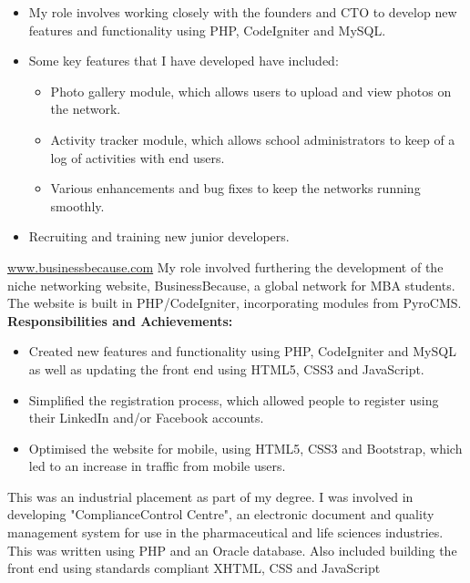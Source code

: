 \documentclass[11pt,a4paper,sans]{moderncv}
\begin{document}
\begin{itemize}%
\item My role involves working closely with the founders and CTO to develop new features and functionality using PHP, CodeIgniter and MySQL.
\item Some key features that I have developed have included:
	\begin{itemize}%
		\item Photo gallery module, which allows users to upload and view photos on the network. 
		\item Activity tracker module, which allows school administrators to keep of a log of activities with end users.
		\item Various enhancements and bug fixes to keep the networks running smoothly.
	\end{itemize}
\item Recruiting and training new junior developers.\\
\end{itemize}

{\href{www.businessbecause.com}{www.businessbecause.com} \newline{}%
My role involved furthering the development of the niche networking website, BusinessBecause, a global network for MBA students. The website is built in PHP/CodeIgniter, incorporating modules from PyroCMS.} 
\textbf{Responsibilities and Achievements:}%
\begin{itemize}%
\item Created new features and functionality using PHP, CodeIgniter and MySQL as well as updating the front end using HTML5, CSS3 and JavaScript. 
\item Simplified the registration process, which allowed people to register using their LinkedIn and/or Facebook accounts.
\item Optimised the website for mobile, using HTML5, CSS3 and Bootstrap, which led to an increase in traffic from mobile users.\\
\end{itemize}

{This was an industrial placement as part of my degree. I was involved in developing "ComplianceControl Centre", an electronic document and quality management system for use in the pharmaceutical and life sciences industries. This was written using PHP and an Oracle database. Also included building the front end using standards compliant XHTML, CSS and JavaScript \newline}
\end{document}
